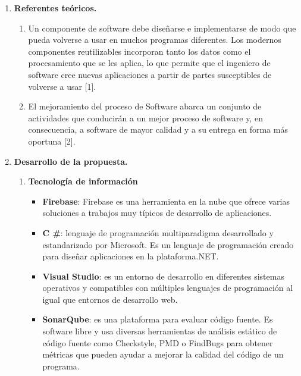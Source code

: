 \documentclass[12pt,a4paper,oneside]{book}
\begin{document}
\begin{enumerate}
\begin{enumerate}
				\end{enumerate}
		\item \textbf{Referentes te\'oricos.}
			 \begin{enumerate}
			  	\item Un componente de software debe diseñarse e implementarse de modo que pueda volverse a usar en muchos programas diferentes. Los modernos componentes reutilizables incorporan tanto los datos como el procesamiento que se les aplica, lo que permite que el ingeniero de software cree nuevas aplicaciones a partir de partes susceptibles de volverse a usar [1].\\
			  	
			  	\item El mejoramiento del proceso de Software abarca un conjunto de actividades que conducirán a un mejor proceso de software y, en consecuencia, a software de mayor calidad y a su entrega en forma más oportuna [2]. 
			  	
			  \end{enumerate}
		\item \textbf{Desarrollo de la propuesta.}
			\begin{enumerate}
				\item \textbf{Tecnolog\'ia de informaci\'on }
					\begin{itemize}
						 
						\item \textbf{Firebase}: Firebase es una herramienta en la nube que ofrece varias soluciones a trabajos muy típicos de desarrollo de aplicaciones.
						
						\item \textbf{C \#}: lenguaje de programación multiparadigma desarrollado y estandarizado por Microsoft. Es un lenguaje de programación creado para diseñar aplicaciones en la plataforma.NET.
						
						\item \textbf{Visual Studio}: es un entorno de desarrollo en diferentes sistemas operativos y compatibles con múltiples lenguajes de programación al igual que entornos de desarrollo web.
						
						\item \textbf{SonarQube}: es una plataforma para evaluar código fuente. Es software libre y usa diversas herramientas de análisis estático de código fuente como Checkstyle, PMD o FindBugs para obtener métricas que pueden ayudar a mejorar la calidad del código de un programa. 
						
					\end{itemize}
					

\end{enumerate}
\end{enumerate}
\end{document}
